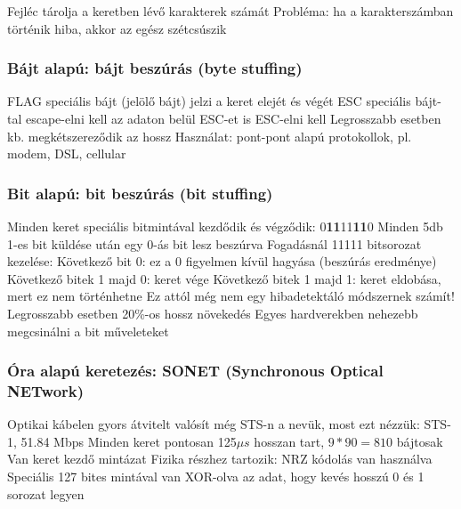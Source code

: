 \documentclass[12pt,a4paper]{article}
\begin{document}
\begin{outline}
	\1 Fejléc tárolja a keretben lévő karakterek számát
	\1 Probléma: ha a karakterszámban történik hiba, akkor az egész szétcsúszik
\end{outline}

\subsubsection{Bájt alapú: bájt beszúrás (byte stuffing)}

\begin{outline}
	\1 FLAG speciális bájt (jelölő bájt) jelzi a keret elejét és végét
		\2 ESC speciális bájt-tal escape-elni kell az adaton belül
		\2 ESC-et is ESC-elni kell
	\1 Legrosszabb esetben kb. megkétszereződik az hossz
	\1 Használat: pont-pont alapú protokollok, pl. modem, DSL, cellular
\end{outline}

\pagebreak

\subsubsection{Bit alapú: bit beszúrás (bit stuffing)}

\begin{outline}
	\1 Minden keret speciális bitmintával kezdődik és végződik: 0\textbf{11}11\textbf{11}0
	\1 Minden 5db 1-es bit küldése után egy 0-ás bit lesz beszúrva
	\1 Fogadásnál 11111 bitsorozat kezelése:
		\2 Következő bit 0: ez a 0 figyelmen kívül hagyása (beszúrás eredménye)
		\2 Következő bitek 1 majd 0: keret vége
		\2 Következő bitek 1 majd 1: keret eldobása, mert ez nem történhetne
			\3 Ez attól még nem egy hibadetektáló módszernek számít! 
	\1 Legrosszabb esetben 20\%-os hossz növekedés
	\1 Egyes hardverekben nehezebb megcsinálni a bit műveleteket
\end{outline}

\subsubsection{Óra alapú keretezés: SONET (Synchronous Optical NETwork)}

\begin{outline}
	\1 Optikai kábelen gyors átvitelt valósít még
	\1 STS-n a nevük, most ezt nézzük: STS-1, 51.84 Mbps
	\1 Minden keret pontosan 125$\mu s$ hosszan tart, $9*90=810$ bájtosak
		\2 Van keret kezdő mintázat
	\1 Fizika részhez tartozik:
		\2 NRZ kódolás van használva
		\2 Speciális 127 bites mintával van XOR-olva az adat, hogy kevés hosszú 0 és 1 sorozat legyen
\end{outline}
\end{document}
